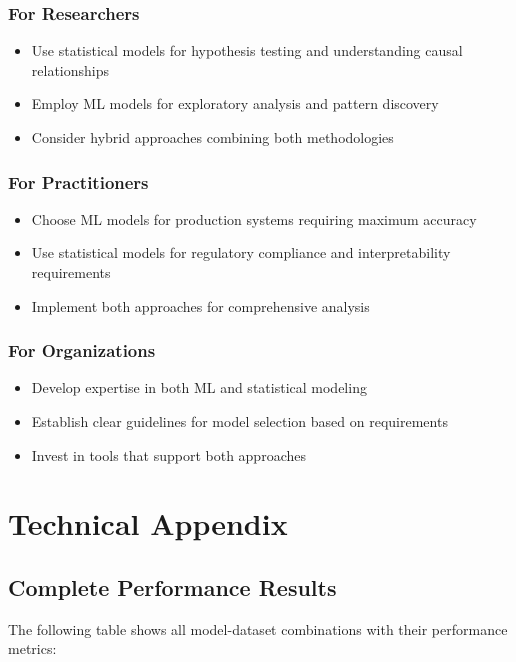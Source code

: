 \documentclass[11pt,a4paper]{article}
\begin{document}
\subsubsection{For Researchers}
\begin{itemize}
\item Use statistical models for hypothesis testing and understanding causal relationships
\item Employ ML models for exploratory analysis and pattern discovery
\item Consider hybrid approaches combining both methodologies
\end{itemize}

\subsubsection{For Practitioners}
\begin{itemize}
\item Choose ML models for production systems requiring maximum accuracy
\item Use statistical models for regulatory compliance and interpretability requirements
\item Implement both approaches for comprehensive analysis
\end{itemize}

\subsubsection{For Organizations}
\begin{itemize}
\item Develop expertise in both ML and statistical modeling
\item Establish clear guidelines for model selection based on requirements
\item Invest in tools that support both approaches
\end{itemize}

\section{Technical Appendix}

\subsection{Complete Performance Results}

The following table shows all model-dataset combinations with their performance metrics:
\end{document}
